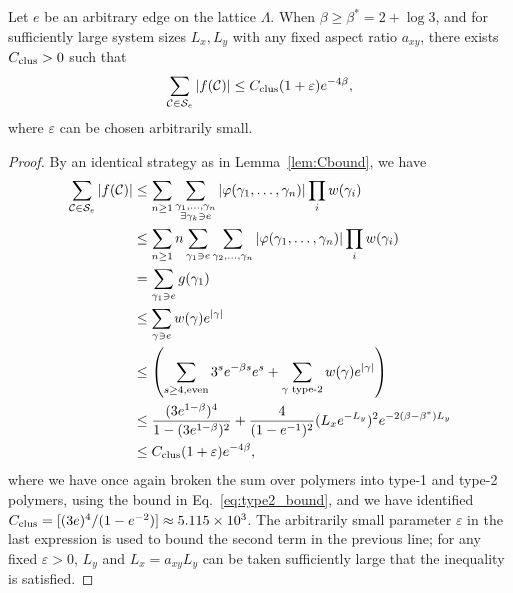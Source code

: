 \begin{lemma}\label{lem:Cbound00}
    Let $e$ be an arbitrary edge on the lattice $\Lambda$. When $\beta \geq \beta^\ast = 2 + \log 3$, and for sufficiently large system sizes $L_x, L_y$ with any fixed aspect ratio $a_{xy}$, there exists $C_{\mathrm{clus}} >0 $ such that 
    \begin{equation}
        \sum_{\mathcal{C} \in \mathcal{S}_e} \abs{f(\mathcal{C})} \leq C_{\mathrm{clus}} (1 + \varepsilon) e^{-4\beta} ,
    \end{equation}
    where $\varepsilon$ can be chosen arbitrarily small.
\end{lemma}
\begin{proof} 
By an identical strategy as in Lemma~\ref{lem:Cbound}, we have
\begin{subequations}
\begin{align}
    \sum_{\mathcal{C} \in \mathcal{S}_e} \abs{f(\mathcal{C})} &\leq \sum_{n\geq 1} \sum_{\substack{\gamma_1,\dots,\gamma_n\\ \exists \gamma_k \ni e}} \abs{\varphi(\gamma_1,\dots,\gamma_n)} \prod_{i} w(\gamma_i) \\
    &\leq \sum_{n\geq 1} n \sum_{\gamma_1 \ni e}\sum_{\gamma_2,\dots,\gamma_n} \abs{\varphi(\gamma_1,\dots,\gamma_n)} \prod_{i} w(\gamma_i) \\
    &= \sum_{\gamma_1 \ni e} g(\gamma_1)\\
    &\leq \sum_{\gamma \ni e} w(\gamma) e^{|\gamma|} \\
    &\leq \left(  \sum_{s \geq 4, \mathrm{even}} 3^s e^{-\beta s} e^{s} + \sum_{\gamma \text{ type-2}} w(\gamma) e^{|\gamma|} \right)\\
    &\leq \frac{(3e^{1-\beta})^4}{1 - (3e^{1-\beta})^2} + \frac{4}{(1 - e^{-1})^2} (L_x e^{-L_y})^2 e^{-2(\beta - \beta^*) L_y} \\
    &\leq C_{\mathrm{clus}} (1 + \varepsilon) e^{-4\beta} ,
\end{align}
\end{subequations}
where we have once again broken the sum over polymers into type-1 and type-2 polymers, using the bound in Eq.~\eqref{eq:type2_bound}, and we have identified $C_{\mathrm{clus}} = [(3e)^4 / (1 - e^{-2})] \approx 5.115 \times 10^3$. The arbitrarily small parameter $\varepsilon$ in the last expression is used to bound the second term in the previous line; for any fixed $\varepsilon > 0$, $L_y$ and $L_x = a_{xy} L_y$ can be taken sufficiently large that the inequality is satisfied.

\end{proof}


